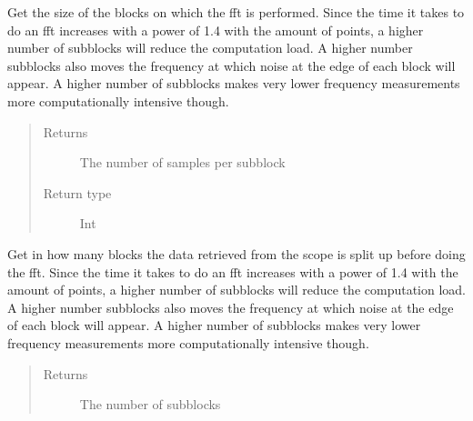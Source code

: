 \documentclass[letterpaper,10pt,english]{sphinxmanual}
\begin{document}
\begin{fulllineitems}
\begin{fulllineitems}
\begin{quote}
\begin{description}
\end{description}\end{quote}

\end{fulllineitems}


\begin{fulllineitems}
\label{\detokenize{index:TiePieLCR_settings.TiePieLCR_settings.get_sub_block_size}}
\sphinxAtStartPar
Get the size of the blocks on which the fft is performed. Since the time it takes to do an fft increases with a power of 1.4 with the amount of points, a higher number of sub\sphinxhyphen{}blocks will reduce the computation load. A higher number sub\sphinxhyphen{}blocks also moves the frequency at which noise at the edge of each block will appear. A higher number of sub\sphinxhyphen{}blocks makes very lower frequency measurements more computationally intensive though.
\begin{quote}\begin{description}
\item[{Returns}] \leavevmode
\sphinxAtStartPar
The number of samples per sub\sphinxhyphen{}block

\item[{Return type}] \leavevmode
\sphinxAtStartPar
Int

\end{description}\end{quote}

\end{fulllineitems}


\begin{fulllineitems}
\label{\detokenize{index:TiePieLCR_settings.TiePieLCR_settings.get_sub_blocks}}
\sphinxAtStartPar
Get in how many blocks the data retrieved from the scope is split up before doing the fft. Since the time it takes to do an fft increases with a power of 1.4 with the amount of points, a higher number of sub\sphinxhyphen{}blocks will reduce the computation load. A higher number sub\sphinxhyphen{}blocks also moves the frequency at which noise at the edge of each block will appear. A higher number of sub\sphinxhyphen{}blocks makes very lower frequency measurements more computationally intensive though.
\begin{quote}\begin{description}
\item[{Returns}] \leavevmode
\sphinxAtStartPar
The number of sub\sphinxhyphen{}blocks


\end{description}
\end{quote}
\end{fulllineitems}
\end{fulllineitems}
\end{document}
